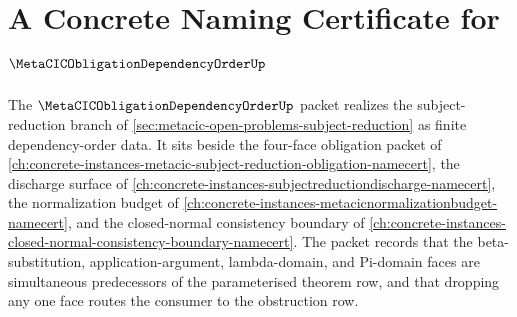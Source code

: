 \chapter{A Concrete Naming Certificate for $\MetaCICObligationDependencyOrderUp$}
\label{ch:concrete-instances-metacic-obligation-dependency-order-namecert}

The $\MetaCICObligationDependencyOrderUp$ packet realizes the subject-reduction branch of \autoref{sec:metacic-open-problems-subject-reduction} as finite dependency-order data. It sits beside the four-face obligation packet of \autoref{ch:concrete-instances-metacic-subject-reduction-obligation-namecert}, the discharge surface of \autoref{ch:concrete-instances-subjectreductiondischarge-namecert}, the normalization budget of \autoref{ch:concrete-instances-metacicnormalizationbudget-namecert}, and the closed-normal consistency boundary of \autoref{ch:concrete-instances-closed-normal-consistency-boundary-namecert}. The packet records that the beta-substitution, application-argument, lambda-domain, and Pi-domain faces are simultaneous predecessors of the parameterised theorem row, and that dropping any one face routes the consumer to the obstruction row.

